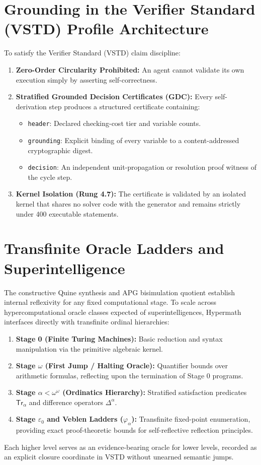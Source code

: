 \documentclass[11pt]{article}
\theoremstyle{definition}
\begin{document}
\section{Grounding in the Verifier Standard (VSTD) Profile Architecture}
To satisfy the Verifier Standard (VSTD) claim discipline:
\begin{enumerate}
\item \textbf{Zero-Order Circularity Prohibited:} An agent cannot validate its own execution simply by asserting self-correctness.
\item \textbf{Stratified Grounded Decision Certificates (GDC):} Every self-derivation step produces a structured certificate containing:
\begin{itemize}
\item \texttt{header}: Declared checking-cost tier and variable counts.
\item \texttt{grounding}: Explicit binding of every variable to a content-addressed cryptographic digest.
\item \texttt{decision}: An independent unit-propagation or resolution proof witness of the cycle step.
\end{itemize}
\item \textbf{Kernel Isolation (Rung 4.7):} The certificate is validated by an isolated kernel that shares no solver code with the generator and remains strictly under 400 executable statements.
\end{enumerate}

\section{Transfinite Oracle Ladders and Superintelligence}
The constructive Quine synthesis and APG bisimulation quotient establish internal reflexivity for any fixed computational stage. To scale across hypercomputational oracle classes expected of superintelligences, Hypermath interfaces directly with transfinite ordinal hierarchies:
\begin{enumerate}
\item \textbf{Stage 0 (Finite Turing Machines):} Basic reduction and syntax manipulation via the primitive algebraic kernel.
\item \textbf{Stage $\omega$ (First Jump / Halting Oracle):} Quantifier bounds over arithmetic formulas, reflecting upon the termination of Stage 0 programs.
\item \textbf{Stage $\alpha < \omega^\omega$ (Ordinatics Hierarchy):} Stratified satisfaction predicates $\mathsf{Tr}_\alpha$ and difference operators $\Delta^\alpha$.
\item \textbf{Stage $\varepsilon_0$ and Veblen Ladders ($\varphi_\alpha$):} Transfinite fixed-point enumeration, providing exact proof-theoretic bounds for self-reflective reflection principles.
\end{enumerate}
Each higher level serves as an evidence-bearing oracle for lower levels, recorded as an explicit closure coordinate in VSTD without unearned semantic jumps.
\end{document}
